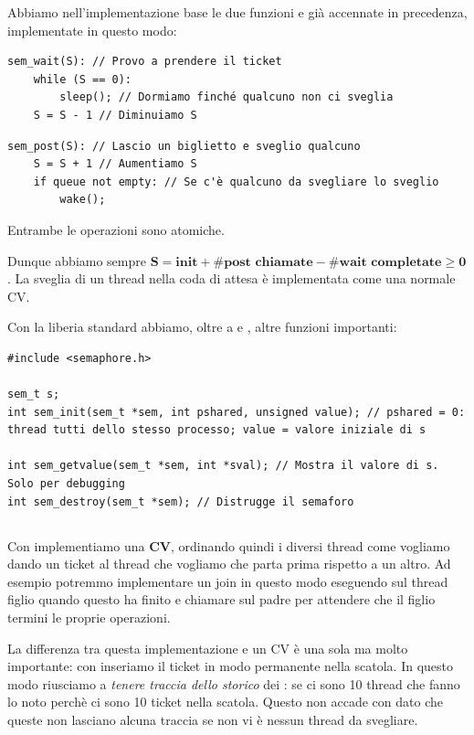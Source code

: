 \documentclass[11pt, a4paper, titlepage, oneside]{scrbook}
\begin{document}
Abbiamo nell'implementazione base le due funzioni  e  già accennate in precedenza, implementate in questo modo:

\begin{lstlisting}[style=C]
sem_wait(S): // Provo a prendere il ticket
    while (S == 0):
        sleep(); // Dormiamo finché qualcuno non ci sveglia
    S = S - 1 // Diminuiamo S 
\end{lstlisting}

\begin{lstlisting}[style=C]
sem_post(S): // Lascio un biglietto e sveglio qualcuno
    S = S + 1 // Aumentiamo S
    if queue not empty: // Se c'è qualcuno da svegliare lo sveglio
        wake();
\end{lstlisting}

\NB Entrambe le operazioni sono atomiche.

Dunque abbiamo sempre \mbox{$\bm{S = \textbf{init} + \#\textbf{post chiamate} - \#\textbf{wait completate} \geq 0}$}. La sveglia di un thread nella coda di attesa è implementata come una normale CV.

Con la liberia standard abbiamo, oltre a  e , altre funzioni importanti:

\begin{lstlisting}[style=C]
#include <semaphore.h>

sem_t s;
int sem_init(sem_t *sem, int pshared, unsigned value); // pshared = 0: thread tutti dello stesso processo; value = valore iniziale di s

int sem_getvalue(sem_t *sem, int *sval); // Mostra il valore di s. Solo per debugging
int sem_destroy(sem_t *sem); // Distrugge il semaforo
\end{lstlisting}

\subsection{}

Con  implementiamo una \textbf{CV}, ordinando quindi i diversi thread come vogliamo dando un ticket al thread che vogliamo che parta prima rispetto a un altro. Ad esempio potremmo implementare un join in questo modo eseguendo  sul thread figlio quando questo ha finito e chiamare  sul padre per attendere che il figlio termini le proprie operazioni. 

La differenza tra questa implementazione e un CV è una sola ma molto importante: con  inseriamo il ticket in modo permanente nella scatola. In questo modo riusciamo a \textit{tenere traccia dello storico} dei : se ci sono 10 thread che fanno  lo noto perchè ci sono 10 ticket nella scatola. Questo non accade con  dato che queste non lasciano alcuna traccia se non vi è nessun thread da svegliare. 
\end{document}
